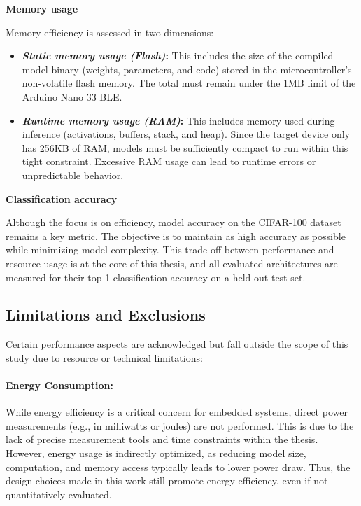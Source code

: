 \textbf{Memory usage}

Memory efficiency is assessed in two dimensions:
\begin{itemize}
    \item \textbf{\textit{Static memory usage (Flash)}:} This includes the size of the compiled model binary (weights, parameters, and code) stored in the microcontroller's non-volatile flash memory. The total must remain under the 1MB limit of the Arduino Nano 33 BLE.

    \item \textbf{\textit{Runtime memory usage (RAM)}:} This includes memory used during inference (activations, buffers, stack, and heap). Since the target device only has 256KB of RAM, models must be sufficiently compact to run within this tight constraint. Excessive RAM usage can lead to runtime errors or unpredictable behavior.
\end{itemize}

\textbf{Classification accuracy}

Although the focus is on efficiency, model accuracy on the CIFAR-100 dataset remains a key metric. The objective is to maintain as high accuracy as possible while minimizing model complexity. This trade-off between performance and resource usage is at the core of this thesis, and all evaluated architectures are measured for their top-1 classification accuracy on a held-out test set.

\subsection{\textbf{Limitations and Exclusions}}

Certain performance aspects are acknowledged but fall outside the scope of this study due to resource or technical limitations:

\paragraph{\textbf{Energy Consumption}:}

While energy efficiency is a critical concern for embedded systems, direct power measurements (e.g., in milliwatts or joules) are not performed. This is due to the lack of precise measurement tools and time constraints within the thesis. However, energy usage is indirectly optimized, as reducing model size, computation, and memory access typically leads to lower power draw. Thus, the design choices made in this work still promote energy efficiency, even if not quantitatively evaluated.

